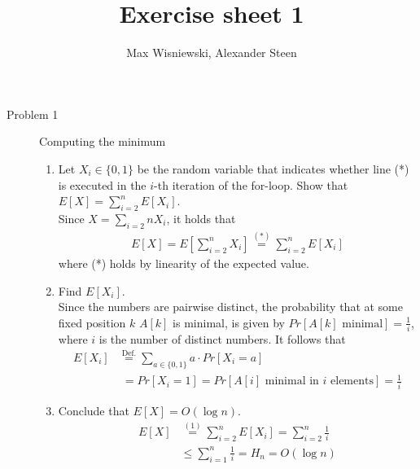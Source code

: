 \documentclass[11pt,a4paper,ngerman]{article}
\date{}
\title{Exercise sheet 1}
\author{Max Wisniewski, Alexander Steen}
\begin{document}

\renewcommand{\figurename}{Figure}

\maketitle
\thispagestyle{fancy}

\begin{description}
\item[Problem 1] Computing the minimum
  \begin{enumerate}
    \item Let $X_i \in \{ 0,1 \}$ be the random variable that indicates whether line (*) is executed
          in the $i$-th iteration of the for-loop. Show that $E[X] = \sum_{i=2}^{n}{E[X_i]}$.\\

          Since $X = \sum_{i=2}{n}{X_i}$, it holds that
          \begin{equation}\begin{split}
            E[X] = E\left[ \sum_{i=2}^n X_i \right] \stackrel{(*)}{=} \sum_{i=2}^{n}{E[X_i]}
          \end{split}\end{equation}
          where (*) holds by linearity of the expected value.
    \item Find $E[X_i]$. \\
          
          Since the numbers are pairwise distinct, the probability that at some fixed position $k$
          $A[k]$ is minimal, is given by $Pr[A[k] \text{ minimal}] = \frac{1}{i}$, where $i$ is the number
          of distinct numbers. It follows that
          \begin{equation}\begin{split}
            E[X_i] & \stackrel{\text{Def.}}{=} \sum_{a \in \{0,1\}}{a \cdot Pr[X_i = a]}\\
                                          &\;= Pr[X_i = 1] = Pr[A[i] \text{ minimal in $i$ elements}]
                                           = \frac{1}{i}
          \end{split}\end{equation}
    \item Conclude that $E[X] = O(\log n)$.
          \begin{equation}\begin{split}
            E[X] &\stackrel{(1)}{=} \sum_{i = 2}^{n}{E[X_i]} = \sum_{i = 2}^{n}{\frac{1}{i}} \\
                 &\leq \sum_{i = 1}^{n}{\frac{1}{i}} = H_n = O(\log n)
          \end{split}\end{equation}
  \end{enumerate}


\end{description}
\end{document}
